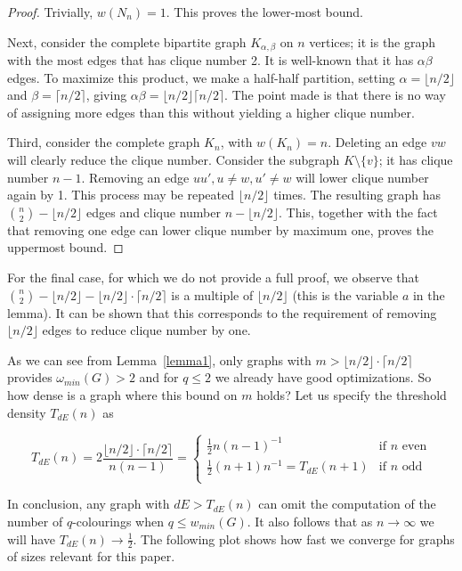 \documentclass[a4paper]{article}
\begin{document}
\begin{proof}
 Trivially, $w(N_n) = 1$. This proves the lower-most bound.
 
 Next, consider the complete bipartite graph $K_{\alpha,\beta}$ on $n$ vertices; it is the graph with the most edges that has clique number 2. It is well-known that it has $\alpha \beta$ edges. To maximize this product, we make a half-half partition, setting $\alpha = \lfloor n / 2 \rfloor$ and $\beta = \lceil n / 2 \rceil$, giving $\alpha \beta = \lfloor n / 2 \rfloor \lceil n / 2 \rceil$. The point made is that there is no way of assigning more edges than this without yielding a higher clique number.
 
 Third, consider the complete graph $K_n$, with $w(K_n) = n$. Deleting an edge $vw$ will clearly reduce the clique number. Consider the subgraph $K \setminus \{v\}$; it has clique number $n - 1$. Removing an edge $uu', u \neq w, u' \neq w$ will lower clique number again by 1. This process may be repeated $\lfloor n / 2 \rfloor$ times. The resulting graph has $\binom{n}{2} - \lfloor n/2 \rfloor$ edges and clique number $n - \lfloor n/2 \rfloor$. This, together with the fact that removing one edge can lower clique number by maximum one, proves the uppermost bound. 
\end{proof}

For the final case, for which we do not provide a full proof, we observe that $\binom{n}{2} - \lfloor n/2 \rfloor - \lfloor n / 2 \rfloor \cdot \lceil n / 2 \rceil$ is a multiple of $\lfloor n/2 \rfloor$ (this is the variable $a$ in the lemma). It can be shown that this corresponds to the requirement of removing $\lfloor n/2 \rfloor$ edges to reduce clique number by one.

As we can see from Lemma~\ref{lemma1}, only graphs with $m > \lfloor n / 2 \rfloor \cdot \lceil n / 2 \rceil$ provides $\omega_{min}(G) > 2$ and for $q \leq 2$ we already have good optimizations. So how dense is a graph where this bound on $m$ holds? Let us specify the threshold density $T_{dE}(n)$ as

\[
T_{dE}(n) = 2\frac{\lfloor n / 2 \rfloor \cdot \lceil n / 2 \rceil}{n(n-1)} =
\begin{cases}
	  \frac{1}{2}n(n-1)^{-1} & \text{if } n \text{ even}\\
	  \frac{1}{2}(n+1)n^{-1} = T_{dE}(n+1) & \text{if } n \text{ odd}\\
\end{cases}
\]

In conclusion, any graph with $dE > T_{dE}(n)$ can omit the computation of the number of $q$-colourings when $q \leq w_{min}(G)$. It also follows that as $n \rightarrow \infty$ we will have $T_{dE}(n) \rightarrow \frac{1}{2}$. The following plot shows how fast we converge for graphs of sizes relevant for this paper.
\end{document}
